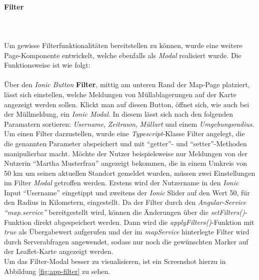 \documentclass[a4paper, 11pt, DIV=11, listof=numbered, numbers=noenddot]{scrartcl}
\begin{document}
	\newpage
	\paragraph{Filter}\label{par:filter}
	\textbf{}\\
	\textbf{}\\
	Um gewisse Filterfunktionalitäten bereitstellen zu können, wurde eine weitere Page-Komponente entwickelt, welche ebenfalls als \textit{Modal} realisiert wurde.
	Die Funktionsweise ist wie folgt:\\
	\textbf{}\\
	Über den \textit{Ionic Button} \textbf{Filter}, mittig am unteren Rand der Map-Page platziert, lässt sich einstellen, welche Meldungen von Müllablagerungen auf der Karte angezeigt werden sollen. Klickt man auf diesen Button, öffnet sich, wie auch bei der Müllmeldung, ein \textit{Ionic Modal}. In diesem lässt sich nach den folgenden Paramatern sortieren: \textit{Username}, \textit{Zeitraum}, \textit{Müllart} und einem \textit{Umgebungsradius}. Um einen Filter darzustellen, wurde eine \textit{Typescript}-Klasse Filter angelegt, die die genannten Parameter abspeichert und mit \enquote{getter}- und \enquote{setter}-Methoden manipulierbar macht.
	Möchte der Nutzer beispielsweise nur Meldungen von der Nutzerin “Martha Musterfrau” angezeigt bekommen, die in einem Umkreis von 50 km um seinen aktuellen Standort gemeldet wurden, müssen zwei Einstellungen im Filter \textit{Modal} getroffen werden. Erstens wird der Nutzername in den \textit{Ionic} Input \enquote{Username} eingetippt und zweitens der \textit{Ionic} Slider auf den Wert 50, für den Radius in Kilometern, eingestellt.
	Da der Filter durch den \textit{Angular-Service \enquote{map.service}} bereitgestellt wird, können die Änderungen über die \textit{setFilters()}-Funktion direkt abgespeichert werden. Dann wird die \textit{applyFilters()}-Funktion mit \textit{true} als Übergabewert aufgerufen und der im \textit{mapService} hinterlegte Filter wird durch Serverabfragen angewendet, sodass nur noch die gewünschten Marker auf der Leaflet-Karte angezeigt werden.\\
	Um das Filter-Modal besser zu visualisieren, ist ein Screenshot hierzu in Abbildung \ref{fig:app-filter} zu sehen.
\end{document}
